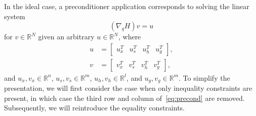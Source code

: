 In the ideal case, a preconditioner application corresponds to solving the
linear system
\begin{equation}\label{eq:precond}
(\nabla_q H) v = u 
\end{equation}
for $v \in \mathbb{R}^{N}$ given an arbitrary $u \in \mathbb{R}^{N}$, where
\begin{align*}
u &=
\begin{bmatrix}
u_x^T & u_s^T & u_h^T & u_g^T \end{bmatrix}, \\
v &=
\begin{bmatrix}
v_x^T & v_s^T & v_h^T & v_g^T \end{bmatrix}, 
\end{align*}
and $u_x, v_x \in \mathbb{R}^n$, $u_s, v_s \in \mathbb{R}^{m}$,  $u_h, v_h \in
\mathbb{R}^{l}$,  and $u_g, v_g \in \mathbb{R}^{m}$.  To simplify the presentation, 
we will first consider the case when only inequality constraints are present, 
in which case the third row and column of~\eqref{eq:precond} are removed.  
Subsequently, we will reintroduce the equality constraints.



